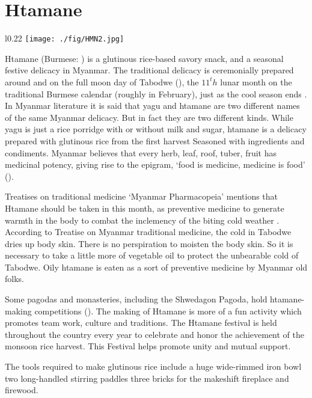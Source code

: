 \documentclass[conference]{IEEEtran}
\begin{document}
\section{Htamane}
\label{sec:Htamane}
\begin{wrapfigure}{l}{0.22\textwidth}
  \centering
\texttt{[image: ./fig/HMN2.jpg]}
\label{fig:HMNFig}
\end{wrapfigure}

Htamane (Burmese: ) is a glutinous rice-based savory snack, and a seasonal festive delicacy in Myanmar. The traditional delicacy is ceremonially prepared around and on the full moon day of Tabodwe (​), the $11^th$ lunar month on the traditional Burmese calendar (roughly in February), just as the cool season ends \cite{b5}. In Myanmar literature it is said that yagu and htamane are two different names of the same Myanmar delicacy. But in fact they are two different kinds. While yagu is just a rice porridge with or without milk and sugar, htamane is a delicacy prepared with glutinous rice from the first harvest Seasoned with ingredients and condiments. Myanmar believes that every herb, leaf, roof, tuber, fruit has medicinal potency, giving rise to the epigram, ‘food is medicine, medicine is food’ (). 

Treatises on traditional medicine ‘Myanmar Pharmacopeia’ mentions that Htamane should be taken in this month, as preventive medicine to generate warmth in the body to combat the inclemency of the biting cold weather \cite{b6}. According to Treatise on Myanmar traditional medicine, the cold in Tabodwe dries up body skin. There is no perspiration to moisten the body skin. So it is necessary to take a little more of vegetable oil to protect the unbearable cold of Tabodwe. Oily htamane is eaten as a sort of preventive medicine by Myanmar old folks. 

Some pagodas and monasteries, including the Shwedagon Pagoda, hold htamane-making competitions ()\cite{b5}. The making of Htamane is more of a fun activity which promotes team work, culture and traditions. The Htamane festival is held throughout the country every year to celebrate and honor the achievement of the monsoon rice harvest. This Festival helps promote unity and mutual support. 

The tools required to make glutinous rice include a huge wide-rimmed iron bowl two long-handled stirring paddles three bricks for the makeshift fireplace and firewood.
\end{document}
